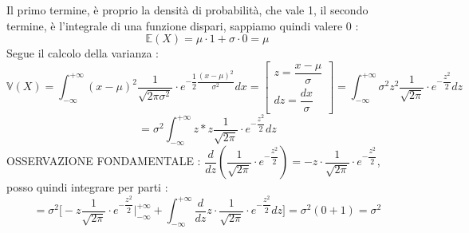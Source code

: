 \documentclass[12pt, letterpaper]{article}
\newcommand{\E}{{\mathbb E}}
\newcommand{\V}{{\mathbb V}}
\begin{document}
Il primo termine, è proprio la densità di probabilità, che vale 1, il secondo termine, è l'integrale 
di una funzione dispari, sappiamo quindi valere 0 : \begin{equation}
    \E(X)=\mu\cdot 1 +\sigma \cdot 0 = \mu 
\end{equation}
Segue il calcolo della varianza :\begin{equation}
    \V(X)=\int_{-\infty}^{+\infty}(x-\mu)^2\dfrac{1}{\sqrt{2\pi\sigma^2}}\cdot e^{-\dfrac{1}{2}\dfrac{(x-\mu)^2}{\sigma^2}}dx 
    =\begin{bmatrix}
        z=\dfrac{x-\mu}{\sigma}\\ dz=\dfrac{dx}{\sigma}
    \end{bmatrix}=
    \int_{-\infty}^{+\infty}\sigma^2z^2 \dfrac{1}{\sqrt{2\pi}}\cdot e^{-\dfrac{z^2}{2}}dz
\end{equation}\begin{equation}
    =\sigma^2\int_{-\infty}^{+\infty}z*z \dfrac{1}{\sqrt{2\pi}}\cdot e^{-\dfrac{z^2}{2}}dz
\end{equation}
OSSERVAZIONE FONDAMENTALE : \(\displaystyle\dfrac{d}{dz}(\dfrac{1}{\sqrt{2\pi}}\cdot e^{-\dfrac{z^2}{2}})=-z\cdot \dfrac{1}{\sqrt{2\pi}}\cdot e^{-\dfrac{z^2}{2}}\), posso quindi 
integrare per parti : 
\begin{equation}
    =\sigma^2\Bigg[-z\dfrac{1}{\sqrt{2\pi}}\cdot e^{-\dfrac{z^2}{2}}\Bigg |_{-\infty}^{+\infty}
    +\int_{-\infty}^{+\infty}\dfrac{d}{dz}z\cdot \dfrac{1}{\sqrt{2\pi}}\cdot e^{-\dfrac{z^2}{2}}dz\Bigg]=\sigma^2(0+1)=\sigma^2
\end{equation}
\end{document}
